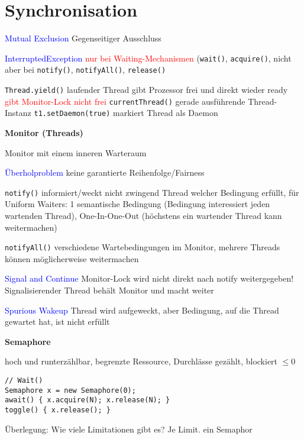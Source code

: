 \section{Synchronisation}

\textcolor{blue}{Mutual Exclusion} Gegenseitiger Ausschluss

\textcolor{blue}{InterruptedException} \textcolor{red}{nur bei Waiting-Mechanismen} (\lstinline{wait()}, \lstinline{acquire()}, nicht aber bei \lstinline{notify()}, \lstinline{notifyAll()}, \lstinline{release()}

\lstinline{Thread.yield()} laufender Thread gibt Prozessor frei und direkt wieder ready \textcolor{red}{gibt Monitor-Lock nicht frei} \lstinline{currentThread()} gerade ausführende Thread-Instanz \lstinline{t1.setDaemon(true)} markiert Thread als Daemon

\textbf{Monitor (Threads)}

Monitor mit einem inneren Warteraum

\textcolor{blue}{Überholproblem} keine garantierte Reihenfolge/Fairness

\lstinline{notify()} informiert/weckt nicht zwingend Thread welcher Bedingung erfüllt, für Uniform Waiters: 1 semantische Bedingung (Bedingung interessiert jeden wartenden Thread), One-In-One-Out (höchstens ein wartender Thread kann weitermachen)

\lstinline{notifyAll()} verschiedene Wartebedingungen im Monitor, mehrere Threads können möglicherweise weitermachen

\textcolor{blue}{Signal and Continue} Monitor-Lock wird nicht direkt nach notify weitergegeben! Signalisierender Thread behält Monitor und macht weiter

\textcolor{blue}{Spurious Wakeup} Thread wird aufgeweckt, aber Bedingung, auf die Thread gewartet hat, ist nicht erfüllt

\textbf{Semaphore}

hoch und runterzählbar, begrenzte Ressource, Durchlässe gezählt, blockiert $\le 0$

\begin{lstlisting}
// Wait()
Semaphore x = new Semaphore(0);
await() { x.acquire(N); x.release(N); }
toggle() { x.release(); }
\end{lstlisting}

Überlegung: Wie viele Limitationen gibt es? Je Limit. ein Semaphor

